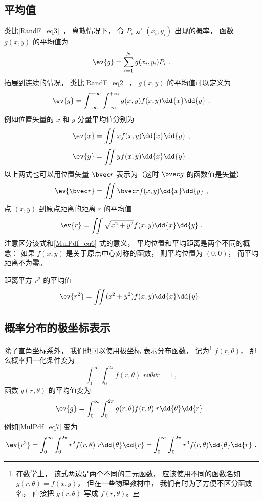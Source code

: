 \subsection{平均值}
类比\autoref{RandF_eq3}~， 离散情况下， 令 $P_i$ 是 $(x_i, y_i)$ 出现的概率， 函数 $g(x,y)$ 的平均值为
\begin{equation}
\ev{g} = \sum_{i=1}^N g(x_i, y_i) P_i~.
\end{equation}
拓展到连续的情况， 类比\autoref{RandF_eq2}~， $g(x, y)$ 的平均值可以定义为
\begin{equation}
\ev{g} =  \int_{-\infty}^{+\infty} \int_{-\infty}^{+\infty} g(x, y) f(x, y) \dd{x} \dd{y}~.
\end{equation}
例如位置矢量的 $x$ 和 $y$ 分量平均值分别为
\begin{equation}\label{MulPdf_eq2}
\ev{x} = \iint x f(x, y) \dd{x}\dd{y}~,
\end{equation}
\begin{equation}
\ev{y} = \iint y f(x, y) \dd{x}\dd{y}~.
\end{equation}
以上两式也可以用位置矢量 $\bvec r$ 表示为（这时 $\bvec g$ 的函数值是矢量）
\begin{equation}\label{MulPdf_eq6}
\ev{\bvec r} = \iint \bvec r f(x, y) \dd{x}\dd{y}~,
\end{equation}
点 $(x,y)$ 到原点距离的距离 $r$ 的平均值
\begin{equation}
\ev{r} = \iint \sqrt{x^2 + y^2} f(x, y) \dd{x}\dd{y}~.
\end{equation}
注意区分该式和\autoref{MulPdf_eq6} 式的意义， 平均位置和平均距离是两个不同的概念： 如果 $f(x, y)$ 是关于原点中心对称的函数， 则平均位置为 $(0, 0)$， 而平均距离不为零。

距离平方 $r^2$ 的平均值
\begin{equation}\label{MulPdf_eq7}
\ev{r^2} = \iint (x^2 + y^2) f(x, y) \dd{x}\dd{y}~.
\end{equation}

\subsection{概率分布的极坐标表示}

除了直角坐标系外， 我们也可以使用极坐标 表示分布函数， 记为\footnote{在数学上， 该式两边是两个不同的二元函数， 应该使用不同的函数名如 $g(r, \theta) = f(x, y)$， 但在一些物理教材中， 我们有时为了方便不区分函数名， 直接把 $g(r, \theta)$ 写成 $f(r, \theta)$。} $f(r, \theta)$， 那么概率归一化条件变为
\begin{equation}\label{MulPdf_eq1}
\int_0^\infty \int_{0}^{2\pi} f(r, \theta)\,\, r\dd{\theta}\dd{r} = 1~,
\end{equation}
函数 $g(r, \theta)$ 的平均值变为
\begin{equation}
\ev{g} = \int_0^\infty \int_{0}^{2\pi} g(r, \theta) f(r, \theta)\,\, r\dd{\theta}\dd{r}~.
\end{equation}
例如\autoref{MulPdf_eq7} 变为
\begin{equation}\label{MulPdf_eq3}
\ev{r^2} = \int_0^\infty \int_{0}^{2\pi} r^2 f(r, \theta)\,\, r\dd{\theta}\dd{r}
= \int_0^\infty \int_{0}^{2\pi} r^3 f(r, \theta) \dd{\theta}\dd{r}~.
\end{equation}

